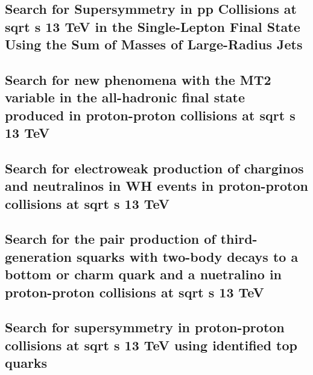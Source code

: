 \documentclass[a4paper, 11pt, twoside, openright]{report}
\begin{document}
\subsection{Search for Supersymmetry in pp Collisions at sqrt s 13 TeV in the Single-Lepton Final State Using the Sum of Masses of Large-Radius Jets}


\subsection{Search for new phenomena with the MT2 variable in the all-hadronic final state produced in proton-proton collisions at sqrt s 13 TeV}


\subsection{Search for electroweak production of charginos and neutralinos in WH events in proton-proton collisions at sqrt s 13 TeV}


\subsection{Search for the pair production of third-generation squarks with two-body decays to a bottom or charm quark and a nuetralino in proton-proton collisions at sqrt s 13 TeV}


\subsection{Search for supersymmetry in proton-proton collisions at sqrt s 13 TeV using identified top quarks}

\end{document}
